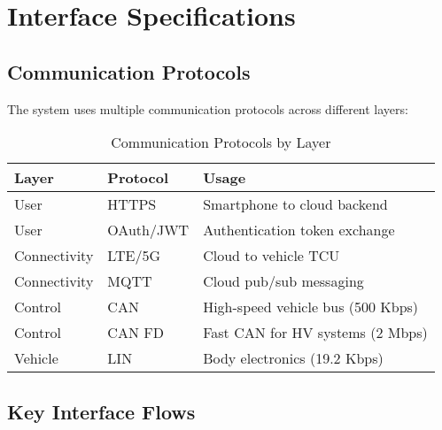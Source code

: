 \documentclass[11pt,a4paper]{article}
\begin{document}
\section{Interface Specifications}

\subsection{Communication Protocols}

The system uses multiple communication protocols across different layers:

\begin{table}[htbp]
\centering
\caption{Communication Protocols by Layer}
\label{tab:protocols}
\begin{tabular}{|l|l|p{7cm}|}
\hline
\textbf{Layer} & \textbf{Protocol} & \textbf{Usage} \\
\hline
User & HTTPS & Smartphone to cloud backend \\
\hline
User & OAuth/JWT & Authentication token exchange \\
\hline
Connectivity & LTE/5G & Cloud to vehicle TCU \\
\hline
Connectivity & MQTT & Cloud pub/sub messaging \\
\hline
Control & CAN & High-speed vehicle bus (500 Kbps) \\
\hline
Control & CAN FD & Fast CAN for HV systems (2 Mbps) \\
\hline
Vehicle & LIN & Body electronics (19.2 Kbps) \\
\hline
\end{tabular}
\end{table}

\subsection{Key Interface Flows}
\end{document}
